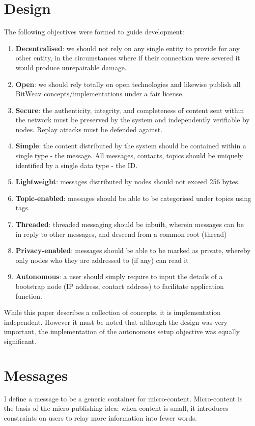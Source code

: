 \documentclass[10pt,a4paper,onecolumn]{article}
\begin{document}
\section{Design}
The following objectives were formed to guide development:
\begin{enumerate}
\item \textbf{Decentralised}: we should not rely on any single entity to provide for any other entity, in the circumstances where if their connection were severed it would produce unrepairable damage. 
\item \textbf{Open}: we should rely totally on open technologies and likewise publish all BitWeav concepts/implementations under a fair license.
\item \textbf{Secure}: the authenticity, integrity, and completeness of content sent within the network must be preserved by the system and independently verifiable by nodes. Replay attacks must be defended against.
\item \textbf{Simple}: the content distributed by the system should be contained within a single type - the message. All messages, contacts, topics should be uniquely identified by a single data type - the ID.
\item \textbf{Lightweight}: messages distributed by nodes should not exceed 256 bytes. 
\item \textbf{Topic-enabled}: messages should be able to be categorised under topics using tags.
\item \textbf{Threaded}: threaded messaging should be inbuilt, wherein messages can be in reply to other messages, and descend from a common root (thread)
\item \textbf{Privacy-enabled}: messages should be able to be marked as private, whereby only nodes who they are addressed to (if any) can read it
\item \textbf{Autonomous}: a user should simply require to input the details of a bootstrap node (IP address, contact address) to facilitate application function.
\end{enumerate}

While this paper describes a collection of concepts, it is implementation independent. However it must be noted that although the design was very important, the implementation of the autonomous setup objective was equally significant.


\section{Messages}
I define a message to be a generic container for micro-content. Micro-content is the basis of the micro-publishing idea: when content is small, it introduces constraints on users to relay more information into fewer words.  
\end{document}
